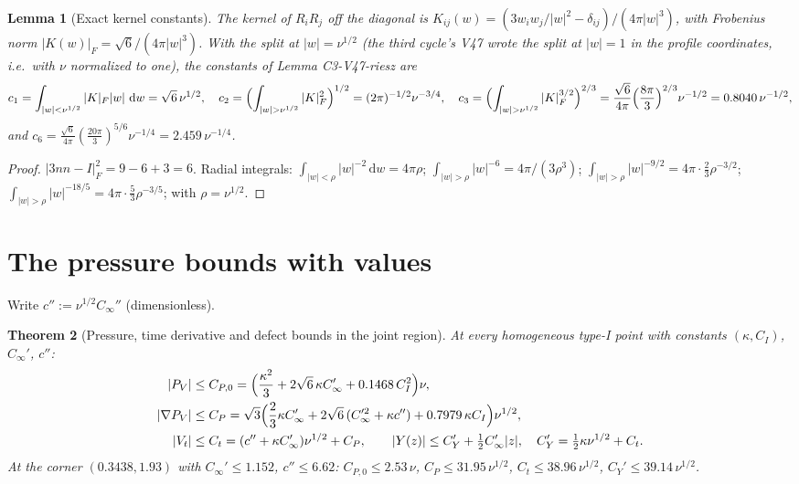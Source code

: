 \documentclass[11pt]{article}
\newcommand{\dd}{\,\mathrm d}
\theoremstyle{plain}
\newtheorem{theorem}{Theorem}[section]
\newtheorem{lemma}[theorem]{Lemma}
\theoremstyle{definition}
\theoremstyle{remark}
\begin{document}
\begin{lemma}[Exact kernel constants]
\label{lem:c4v12-kernel}
The kernel of \(R_iR_j\) off the diagonal is \(K_{ij}(w)=(3w_iw_j/|w|^2-\delta_{ij})/(4\pi|w|^3)\),
with Frobenius norm \(|K(w)|_F=\sqrt6/(4\pi|w|^3)\).  With the split at \(|w|=\nu^{1/2}\)
(the third cycle's V47 wrote the split at \(|w|=1\) in the profile
coordinates, i.e.\ with \(\nu\) normalized to one), the constants of
Lemma C3-V47-riesz are
\begin{equation}
 c_1=\int_{|w|<\nu^{1/2}}|K|_F|w|\,\dd w=\sqrt6\,\nu^{1/2},\quad
 c_2=\Bigl(\int_{|w|>\nu^{1/2}}|K|_F^2\Bigr)^{1/2}=(2\pi)^{-1/2}\nu^{-3/4},\quad
 c_3=\Bigl(\int_{|w|>\nu^{1/2}}|K|_F^{3/2}\Bigr)^{2/3}=\frac{\sqrt6}{4\pi}\Bigl(\frac{8\pi}3\Bigr)^{2/3}\nu^{-1/2}=0.8040\,\nu^{-1/2},
 \label{eq:c4v12-kernel}
\end{equation}
and \(c_6=\frac{\sqrt6}{4\pi}(\frac{20\pi}3)^{5/6}\nu^{-1/4}=2.459\,\nu^{-1/4}\).
\end{lemma}

\begin{proof}
\(|3nn-I|_F^2=9-6+3=6\).  Radial integrals: \(\int_{|w|<\rho}|w|^{-2}\dd w=4\pi\rho\);
\(\int_{|w|>\rho}|w|^{-6}=4\pi/(3\rho^3)\); \(\int_{|w|>\rho}|w|^{-9/2}=4\pi\cdot\frac23\rho^{-3/2}\); \(\int_{|w|>\rho}|w|^{-18/5}=4\pi\cdot\frac53\rho^{-3/5}\);
with \(\rho=\nu^{1/2}\).
\end{proof}

\section{The pressure bounds with values}
\label{sec:c4v12-pressure}

Write \(c'':=\nu^{1/2}C_\infty''\) (dimensionless).

\begin{theorem}[Pressure, time derivative and defect bounds in the joint region]
\label{thm:c4v12-pressure}
At every homogeneous type-I point with constants \((\kappa,C_I)\), \(C_\infty'\), \(c''\):
\begin{align}
 |P_V|&\le C_{P,0}=\Bigl(\frac{\kappa^2}3+2\sqrt6\,\kappa C_\infty'+0.1468\,C_I^2\Bigr)\nu,
 \label{eq:c4v12-P0}\\
 |\nabla P_V|&\le C_P=\sqrt3\Bigl(\frac23\kappa C_\infty'+2\sqrt6\,(C_\infty'^2+\kappa c'')+0.7979\,\kappa C_I\Bigr)\nu^{1/2},
 \label{eq:c4v12-P}\\
 |V_t|&\le C_t=(c''+\kappa C_\infty')\nu^{1/2}+C_P,\qquad |Y(z)|\le C_Y'+\tfrac12C_\infty'|z|,\quad C_Y'=\tfrac12\kappa\nu^{1/2}+C_t .
 \label{eq:c4v12-t}
\end{align}
At the corner \((0.3438,1.93)\) with \(C_\infty'\le1.152\), \(c''\le6.62\):
\(C_{P,0}\le2.53\,\nu\), \(C_P\le31.95\,\nu^{1/2}\), \(C_t\le38.96\,\nu^{1/2}\), \(C_Y'\le39.14\,\nu^{1/2}\).
\end{theorem}
\end{document}
